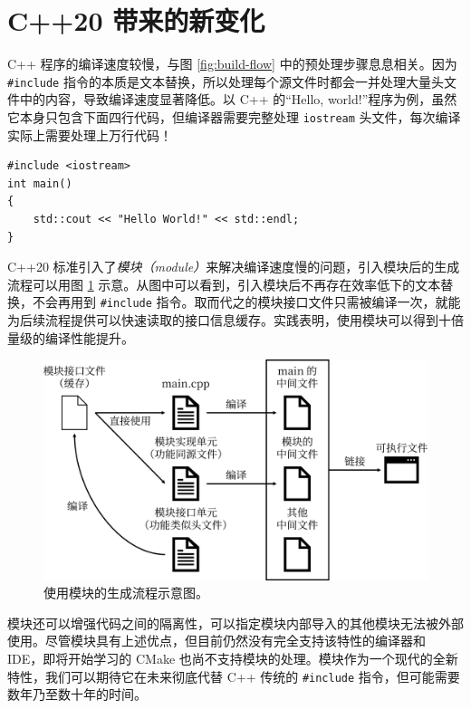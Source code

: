 
\section{C++20 带来的新变化}

C++ 程序的编译速度较慢，与图 \ref{fig:build-flow} 中的预处理步骤息息相关。因为 \lstinline[language={[latest]C++}]{#include} 指令的本质是文本替换，所以处理每个源文件时都会一并处理大量头文件中的内容，导致编译速度显著降低。以 C++ 的“Hello, world!”程序为例，虽然它本身只包含下面四行代码，但编译器需要完整处理 \lstinline[language={}]{iostream} 头文件，每次编译实际上需要处理上万行代码\cite{cpp-module-1}！

\begin{lstlisting}[language={[latest]C++}, moreemph={[2]endl}]
#include <iostream>
int main()
{
	std::cout << "Hello World!" << std::endl;
}
\end{lstlisting}

C++20 标准引入了\emph{模块（module）}来解决编译速度慢的问题，引入模块后的生成流程可以用图 \ref{fig:module} 示意\cite{cpp-module-1}。从图中可以看到，引入模块后不再存在效率低下的文本替换，不会再用到 \lstinline[language={[latest]C++}]{#include} 指令。取而代之的模块接口文件只需被编译一次，就能为后续流程提供可以快速读取的接口信息缓存。实践表明，使用模块可以得到十倍量级的编译性能提升\cite{cpp-module-2}。

\begin{figure}[H]
	\centering
	\includegraphics[scale=0.15]{assets/module}
	\caption{使用模块的生成流程示意图。}
	\label{fig:module}
\end{figure}

模块还可以增强代码之间的隔离性，可以指定模块内部导入的其他模块无法被外部使用\cite{cpp-module-3}。尽管模块具有上述优点，但目前仍然没有完全支持该特性的编译器和 IDE，即将开始学习的 CMake 也尚不支持模块的处理。模块作为一个现代的全新特性，我们可以期待它在未来彻底代替 C++ 传统的 \lstinline[language={[latest]C++}]{#include} 指令，但可能需要数年乃至数十年的时间。